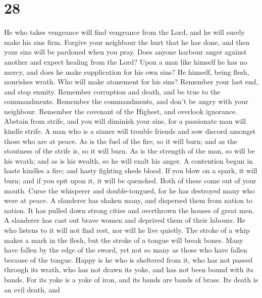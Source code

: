 \hypertarget{section-8}{%
\section{28}\label{section-8}}

 He who takes vengeance will find vengeance from the Lord,
and he will surely make his sins firm.  Forgive your
neighbour the hurt that he has done, and then your sins will be pardoned
when you pray.  Does anyone harbour anger against another
and expect healing from the Lord?  Upon a man like himself
he has no mercy, and does he make supplication for his own sins?
 He himself, being flesh, nourishes wrath. Who will make
atonement for his sins?  Remember your last end, and stop
enmity. Remember corruption and death, and be true to the commandments.
 Remember the commandments, and don't be angry with your
neighbour. Remember the covenant of the Highest, and overlook ignorance.
 Abstain from strife, and you will diminish your sins, for a
passionate man will kindle strife.  A man who is a sinner
will trouble friends and sow discord amongst those who are at peace.
 As is the fuel of the fire, so it will burn; and as the
stoutness of the strife is, so it will burn. As is the strength of the
man, so will be his wrath; and as is his wealth, so he will exalt his
anger.  A contention begun in haste kindles a fire; and
hasty fighting sheds blood.  If you blow on a spark, it
will burn; and if you spit upon it, it will be quenched. Both of these
come out of your mouth.  Curse the whisperer and
double-tongued, for he has destroyed many who were at peace.
 A slanderer has shaken many, and dispersed them from
nation to nation. It has pulled down strong cities and overthrown the
houses of great men.  A slanderer has cast out brave women
and deprived them of their labours.  He who listens to it
will not find rest, nor will he live quietly.  The stroke
of a whip makes a mark in the flesh, but the stroke of a tongue will
break bones.  Many have fallen by the edge of the sword,
yet not so many as those who have fallen because of the tongue.
 Happy is he who is sheltered from it, who has not passed
through its wrath, who has not drawn its yoke, and has not been bound
with its bands.  For its yoke is a yoke of iron, and its
bands are bands of brass.  Its death is an evil death, and
